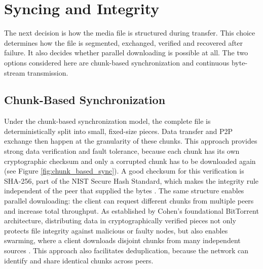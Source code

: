 \section{Syncing and Integrity}
\indent \par The next decision is how the media file is structured during transfer. This choice determines how the file is segmented, exchanged, verified and recovered after failure. It also decides whether parallel downloading is possible at all. The two options considered here are chunk-based synchronization and continuous byte-stream transmission.


\subsection{Chunk-Based Synchronization}
\indent \par Under the chunk-based synchronization model, the complete file is deterministically split into small, fixed-size pieces. Data transfer and P2P exchange then happen at the granularity of these chunks. This approach provides strong data verification and fault tolerance, because each chunk has its own cryptographic checksum and only a corrupted chunk has to be downloaded again (see Figure \ref{fig:chunk_based_sync}). A good checksum for this verification is SHA-256, part of the NIST Secure Hash Standard, which makes the integrity rule independent of the peer that supplied the bytes \cite{secure_hash_standard}. The same structure enables parallel downloading: the client can request different chunks from multiple peers and increase total throughput. As established by Cohen's foundational BitTorrent architecture, distributing data in cryptographically verified pieces not only protects file integrity against malicious or faulty nodes, but also enables swarming, where a client downloads disjoint chunks from many independent sources \cite{bittorent}. This approach also facilitates deduplication, because the network can identify and share identical chunks across peers.

